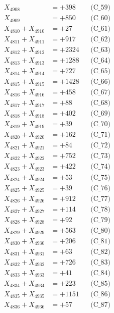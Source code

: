 \documentclass[a4paper,10pt]{article}
\begin{document}
{\begin{align}
X_{4908} &= +398 && \text{(C\_59)} \\
X_{4909} &= +850 && \text{(C\_60)} \\
\allowbreak
X_{4810} + X_{4910} &= +27 && \text{(C\_61)} \\
X_{4811} + X_{4911} &= +917 && \text{(C\_62)} \\
X_{4812} + X_{4912} &= +2324 && \text{(C\_63)} \\
X_{4813} + X_{4913} &= +1288 && \text{(C\_64)} \\
X_{4814} + X_{4914} &= +727 && \text{(C\_65)} \\
\allowbreak
X_{4815} + X_{4915} &= +1428 && \text{(C\_66)} \\
X_{4816} + X_{4916} &= +458 && \text{(C\_67)} \\
X_{4817} + X_{4917} &= +88 && \text{(C\_68)} \\
X_{4818} + X_{4918} &= +402 && \text{(C\_69)} \\
X_{4819} + X_{4919} &= +39 && \text{(C\_70)} \\
\allowbreak
X_{4820} + X_{4920} &= +162 && \text{(C\_71)} \\
X_{4821} + X_{4921} &= +84 && \text{(C\_72)} \\
X_{4822} + X_{4922} &= +752 && \text{(C\_73)} \\
X_{4823} + X_{4923} &= +422 && \text{(C\_74)} \\
X_{4824} + X_{4924} &= +53 && \text{(C\_75)} \\
\allowbreak
X_{4825} + X_{4925} &= +39 && \text{(C\_76)} \\
X_{4826} + X_{4926} &= +912 && \text{(C\_77)} \\
X_{4827} + X_{4927} &= +114 && \text{(C\_78)} \\
X_{4828} + X_{4928} &= +92 && \text{(C\_79)} \\
X_{4829} + X_{4929} &= +563 && \text{(C\_80)} \\
\allowbreak
X_{4830} + X_{4930} &= +206 && \text{(C\_81)} \\
X_{4831} + X_{4931} &= +63 && \text{(C\_82)} \\
X_{4832} + X_{4932} &= +726 && \text{(C\_83)} \\
X_{4833} + X_{4933} &= +41 && \text{(C\_84)} \\
X_{4834} + X_{4934} &= +223 && \text{(C\_85)} \\
\allowbreak
X_{4835} + X_{4935} &= +1151 && \text{(C\_86)} \\
X_{4836} + X_{4936} &= +57 && \text{(C\_87)} \\

\end{align}}
\end{document}
